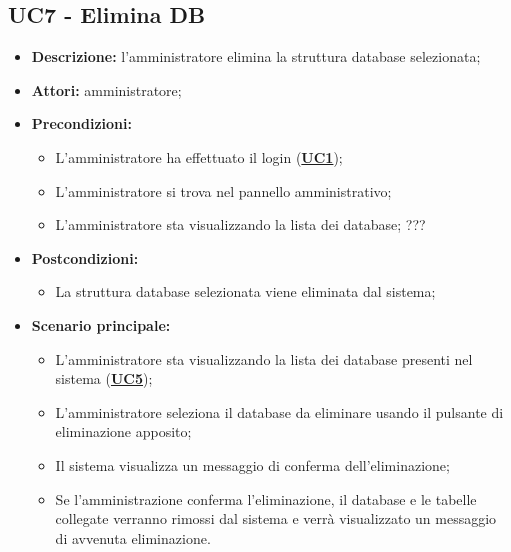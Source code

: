 \documentclass[5pt]{article}
\begin{document}
\subsection{UC7 - Elimina DB}
\label{sec:UC7}
\begin{itemize}
	\item \textbf{Descrizione:} l’amministratore elimina la struttura database selezionata;
	\item \textbf{Attori:} amministratore;
	\item \textbf{Precondizioni:} 
	\begin{itemize}
		\item L’amministratore ha effettuato il login (\hyperref[sec:UC1]{\textbf{UC1}});
		\item L’amministratore si trova nel pannello amministrativo;
		\item L’amministratore sta visualizzando la lista dei database; ???
	\end{itemize}
	\item \textbf{Postcondizioni:} 
	\begin{itemize}
		\item La struttura database selezionata viene eliminata dal sistema;
	\end{itemize}
	\item \textbf{Scenario principale:} 
	\begin{itemize}
		\item L'amministratore sta visualizzando la lista dei database presenti nel sistema (\hyperref[sec:UC5]{\textbf{UC5}});
		\item L'amministratore seleziona il database da eliminare usando il pulsante di eliminazione apposito;
		\item Il sistema visualizza un messaggio di conferma dell'eliminazione;
		\item Se l'amministrazione conferma l'eliminazione, il database e le tabelle collegate verranno rimossi dal sistema e verrà visualizzato un messaggio di avvenuta eliminazione.
	\end{itemize}
\end{itemize}
\end{document}
